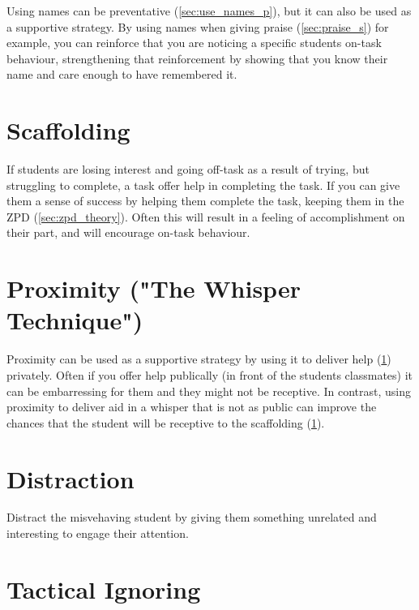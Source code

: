 \documentclass[12pt]{report}
\begin{document}
Using names can be preventative (\ref{sec:use_names_p}), but it can also be used as a supportive strategy. By using names when giving praise (\ref{sec:praise_s}) for example, you can reinforce that you are noticing a specific students on-task behaviour, strengthening that reinforcement by showing that you know their name and care enough to have remembered it.



\section{Scaffolding}
\label{sec:scaffolding_s}

If students are losing interest and going off-task as a result of trying, but struggling to complete, a task offer help in completing the task. If you can give them a sense of success by helping them complete the task, keeping them in the ZPD (\ref{sec:zpd_theory}). Often this will result in a feeling of accomplishment on their part, and will encourage on-task behaviour.



\section{Proximity ("The Whisper Technique")}
\label{sec:proximity_s}

Proximity can be used as a supportive strategy by using it to deliver help (\ref{sec:scaffolding_s}) privately. Often if you offer help publically (in front of the students classmates) it can be embarressing for them and they might not be receptive. In contrast, using proximity to deliver aid in a whisper that is not as public can improve the chances that the student will be receptive to the scaffolding (\ref{sec:scaffolding_s}).



\section{Distraction}
\label{sec:distraction_s}

Distract the misvehaving student by giving them something unrelated and interesting to engage their attention.



\section{Tactical Ignoring}
\label{sec:tactical_ignoring_s}
\end{document}
